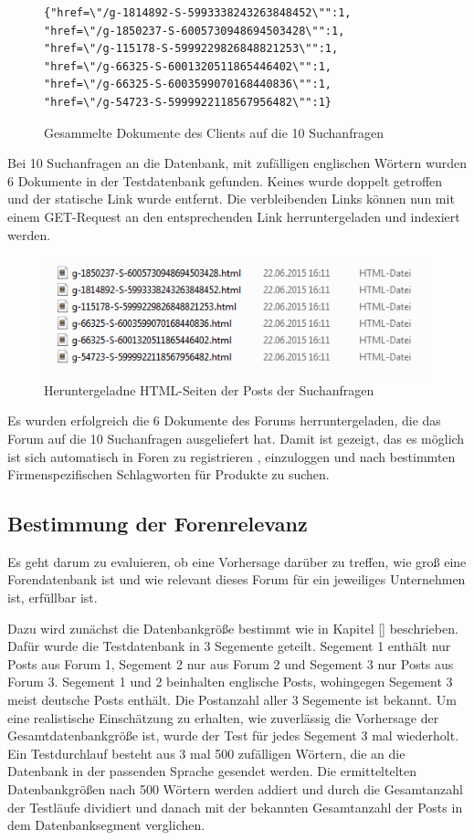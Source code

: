 \begin{figure}[h!]
\begin{lstlisting}[language=HTML5]
{"href=\"/g-1814892-S-5993338243263848452\"":1,
"href=\"/g-1850237-S-6005730948694503428\"":1,
"href=\"/g-115178-S-5999229826848821253\"":1,
"href=\"/g-66325-S-6001320511865446402\"":1,
"href=\"/g-66325-S-6003599070168440836\"":1,
"href=\"/g-54723-S-5999922118567956482\"":1}
\end{lstlisting}
\caption{Gesammelte Dokumente des Clients auf die 10 Suchanfragen}
\end{figure}

Bei 10 Suchanfragen an die Datenbank, mit zufälligen englischen Wörtern wurden 6 Dokumente in der Testdatenbank gefunden. Keines wurde doppelt getroffen und der statische Link wurde entfernt. Die verbleibenden Links können nun mit einem GET-Request an den entsprechenden Link herruntergeladen und indexiert werden.

\begin{figure}[h!]
\includegraphics{./images/postdownload.png}
\caption{Heruntergeladne HTML-Seiten der Posts der Suchanfragen}
\end{figure}


Es wurden erfolgreich die 6 Dokumente des Forums herruntergeladen, die das Forum auf die 10 Suchanfragen ausgeliefert hat.
Damit ist gezeigt, das es möglich ist sich automatisch in Foren zu registrieren , einzuloggen und nach bestimmten Firmenspezifischen Schlagworten für Produkte zu suchen.

\subsection{Bestimmung der Forenrelevanz}

Es geht darum zu evaluieren, ob eine Vorhersage darüber zu treffen, wie groß eine Forendatenbank ist und wie relevant dieses Forum für ein jeweiliges Unternehmen ist, erfüllbar ist.

Dazu wird zunächst die Datenbankgröße bestimmt wie in Kapitel [] beschrieben. Dafür wurde die Testdatenbank in 3 Segemente geteilt. Segement 1 enthält nur Posts aus Forum 1, Segement 2 nur aus Forum 2 und Segement 3 nur Posts aus Forum 3. 
Segement 1 und 2 beinhalten englische Posts, wohingegen Segement 3 meist deutsche Posts enthält. Die Postanzahl aller 3 Segemente ist bekannt. Um eine realistische Einschätzung zu erhalten, wie zuverlässig die Vorhersage der Gesamtdatenbankgröße ist, wurde der Test für jedes Segement 3 mal wiederholt. Ein Testdurchlauf besteht aus 3 mal 500 zufälligen Wörtern, die an die Datenbank in der passenden Sprache gesendet werden. Die ermitteltelten Datenbankgrößen nach 500 Wörtern werden addiert und durch die Gesamtanzahl der Testläufe dividiert und danach mit der bekannten Gesamtanzahl der Posts in dem Datenbanksegment verglichen.

